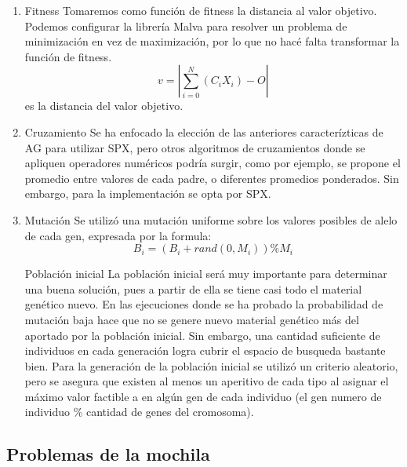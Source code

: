\documentclass[9pt,conference]{IEEEtran}
\begin{document}
\begin{enumerate}
	\item Fitness
		Tomaremos como función de fitness la distancia al valor objetivo.
		Podemos configurar la librería Malva para resolver un problema de minimización en vez de maximización, por lo que no hacé falta transformar la función de fitness.
		\[ v = |\sum\limits_{i=0}^{N} (C_i X_i) - O| \]
		es la distancia del valor objetivo.

	\item Cruzamiento
		Se ha enfocado la elección de las anteriores caracterízticas de AG para utilizar SPX, pero otros algoritmos de cruzamientos donde se apliquen operadores numéricos podría surgir, como por ejemplo, se propone el promedio entre valores de cada padre, o diferentes promedios ponderados. Sin embargo, para la implementación se opta por SPX.

	\item Mutación
		Se utilizó una mutación uniforme sobre los valores posibles de alelo de cada gen, expresada por la formula:
		\[ B_i = (B_i + rand(0,M_i)) \% M_i \]


	Población inicial
		La población inicial será muy importante para determinar una buena solución, pues a partir de ella se tiene casi todo el material genético nuevo. En las ejecuciones donde se ha probado la probabilidad de mutación baja hace que no se genere nuevo material genético más del aportado por la población inicial. Sin embargo, una cantidad suficiente de individuos en cada generación logra cubrir el espacio de busqueda bastante bien. Para la generación de la población inicial se utilizó un criterio aleatorio, pero se asegura que existen al menos un aperitivo de cada tipo al asignar el máximo valor factible a en algún gen de cada individuo (el gen numero de individuo \% cantidad de genes del cromosoma).
	\end{enumerate}

	\subsection{Problemas de la mochila}
\end{document}
